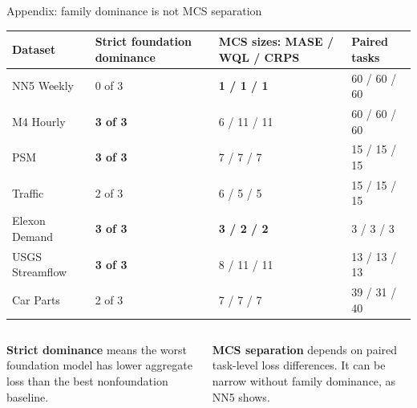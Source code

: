 \documentclass[aspectratio=169,10pt]{beamer}
\begin{document}
\begin{frame}[noframenumbering]{Appendix: family dominance is not MCS separation}
  \vspace{0.03cm}
  \begin{center}
    \fontsize{7.2}{8.1}\selectfont
    \renewcommand{\arraystretch}{1.14}
    \setlength{\tabcolsep}{5.2pt}
    \begin{tabular}{L{3.10cm} C{2.35cm} C{3.85cm} C{2.40cm}}
      \toprule
      \textbf{Dataset} & \textbf{Strict foundation dominance} &
      \textbf{MCS sizes: MASE / WQL / CRPS} & \textbf{Paired tasks} \\
      \midrule
      NN5 Weekly & 0 of 3 & \textbf{1 / 1 / 1} & 60 / 60 / 60 \\
       M4 Hourly & \textbf{3 of 3} & 6 / 11 / 11 & 60 / 60 / 60 \\
      PSM & \textbf{3 of 3} & 7 / 7 / 7 & 15 / 15 / 15 \\
       Traffic & 2 of 3 & 6 / 5 / 5 & 15 / 15 / 15 \\
      Elexon Demand & \textbf{3 of 3} & \textbf{3 / 2 / 2} & 3 / 3 / 3 \\
       USGS Streamflow & \textbf{3 of 3} & 8 / 11 / 11 & 13 / 13 / 13 \\
      Car Parts & 2 of 3 & 7 / 7 / 7 & 39 / 31 / 40 \\
      \bottomrule
    \end{tabular}
  \end{center}

  \vspace{0.16cm}
  \begin{columns}[T,totalwidth=0.90\linewidth]
    \begin{column}{0.43\linewidth}
      \fontsize{7.8}{9.0}\selectfont
      \textbf{Strict dominance} means the worst foundation model has lower
      aggregate loss than the best nonfoundation baseline.
    \end{column}
    \begin{column}{0.43\linewidth}
      \fontsize{7.8}{9.0}\selectfont
      \textbf{MCS separation} depends on paired task-level loss differences.
      It can be narrow without family dominance, as NN5 shows.
    \end{column}
  \end{columns}
\end{frame}
\end{document}
